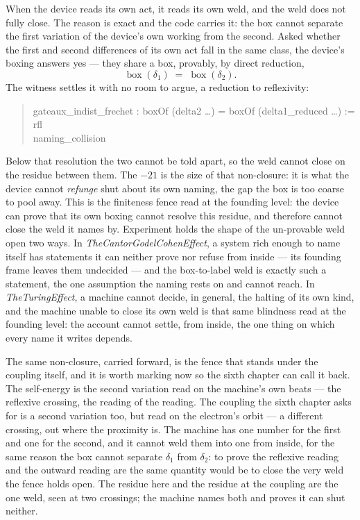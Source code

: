 When the device reads its own act, it reads its own weld, and the weld does not fully close.
The reason is exact and the code carries it: the box cannot separate the first variation of the device's own working
from the second.
Asked whether the first and second differences of its own act fall in the same class, the device's boxing answers
yes --- they share a box, provably, by direct reduction,
\[
  \operatorname{box}(\delta_1) \;=\; \operatorname{box}(\delta_2) .
\]
The witness settles it with no room to argue, a reduction to reflexivity:
\begin{quote}\ttfamily
gateaux\_indist\_frechet : boxOf (delta2 …) = boxOf (delta1\_reduced …) := rfl\\
naming\_collision
\end{quote}
Below that resolution the two cannot be told apart, so the weld cannot close on the residue between them.
The $-21$ is the size of that non-closure: it is what the device cannot \emph{refunge} shut about its own naming, the
gap the box is too coarse to pool away.
This is the finiteness fence read at the founding level: the device can prove that its own boxing cannot resolve this
residue, and therefore cannot close the weld it names by.
Experiment holds the shape of the un-provable weld open two ways.
In \emph{TheCantorGodelCohenEffect}, a system rich enough to name itself has statements it can neither prove nor refuse
from inside --- its founding frame leaves them undecided --- and the box-to-label weld is exactly such a statement, the
one assumption the naming rests on and cannot reach.
In \emph{TheTuringEffect}, a machine cannot decide, in general, the halting of its own kind, and the machine unable to
close its own weld is that same blindness read at the founding level: the account cannot settle, from inside, the one
thing on which every name it writes depends.

The same non-closure, carried forward, is the fence that stands under the coupling itself, and it is worth marking now
so the sixth chapter can call it back.
The self-energy is the second variation read on the machine's own beats --- the reflexive crossing, the reading of the
reading.
The coupling the sixth chapter asks for is a second variation too, but read on the electron's orbit --- a different
crossing, out where the proximity is.
The machine has one number for the first and one for the second, and it cannot weld them into one from inside, for the
same reason the box cannot separate $\delta_1$ from $\delta_2$: to prove the reflexive reading and the outward reading
are the same quantity would be to close the very weld the fence holds open.
The residue here and the residue at the coupling are the one weld, seen at two crossings; the machine names both and
proves it can shut neither.

